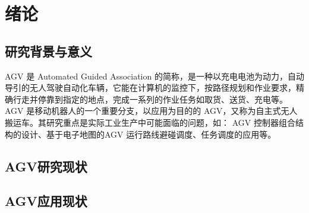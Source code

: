 \newpage
\section{绪论}
\subsection{研究背景与意义}

AGV 是 Automated Guided Association 的简称，是一种以充电电池为动力，自动导引的无人驾驶自动化车辆，它能在计算机的监控下，按路径规划和作业要求，精确行走并停靠到指定的地点，完成一系列的作业任务如取货、送货、充电等。
AGV 是移动机器人的一个重要分支，以应用为目的的 AGV，又称为自主式无人搬运车。其研究重点是实际工业生产中可能面临的问题，如： AGV 控制器组合结构的设计、基于电子地图的AGV 运行路线避碰调度、任务调度的应用等。

\subsection{AGV研究现状}



\subsection{AGV应用现状}

